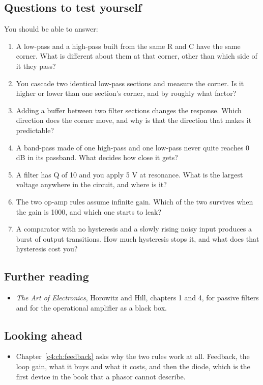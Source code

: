 \subsection*{Questions to test yourself}
You should be able to answer:
\begin{enumerate}
  \item A low-pass and a high-pass built from the same R and C have the same corner. What is different about them at that corner, other than which side of it they pass?
  \item You cascade two identical low-pass sections and measure the corner. Is it higher or lower than one section's corner, and by roughly what factor?
  \item Adding a buffer between two filter sections changes the response. Which direction does the corner move, and why is that the direction that makes it predictable?
  \item A band-pass made of one high-pass and one low-pass never quite reaches 0 dB in its passband. What decides how close it gets?
  \item A filter has Q of 10 and you apply 5 V at resonance. What is the largest voltage anywhere in the circuit, and where is it?
  \item The two op-amp rules assume infinite gain. Which of the two survives when the gain is 1000, and which one starts to leak?
  \item A comparator with no hysteresis and a slowly rising noisy input produces a burst of output transitions. How much hysteresis stops it, and what does that hysteresis cost you?
\end{enumerate}

\subsection*{Further reading}
\begin{itemize}
  \item \emph{The Art of Electronics}, Horowitz and Hill, chapters 1 and 4, for passive filters and for the operational amplifier as a black box.
\end{itemize}

\subsection*{Looking ahead}
\begin{itemize}
  \item Chapter~\ref{c4:ch:feedback} asks why the two rules work at all. Feedback, the loop gain, what it buys and what it costs, and then the diode, which is the first device in the book that a phasor cannot describe.
\end{itemize}
